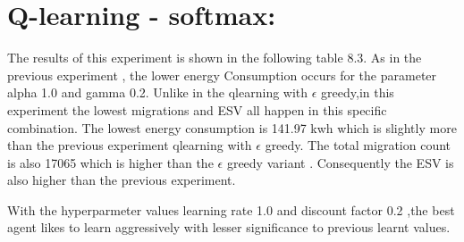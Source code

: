 \documentclass[a4paper,12pt]{Classes/RoboticsLaTeX}
\begin{document}
     
        \section{Q-learning - softmax:}

        The results of this experiment is shown in the following table 8.3. As in the previous experiment , the lower energy Consumption occurs for the parameter alpha 1.0 and gamma 0.2. Unlike in the qlearning with $\epsilon$ greedy,in this experiment the lowest migrations and ESV all happen in this specific combination. The lowest energy consumption is 141.97 kwh which is slightly more than the previous experiment qlearning with $\epsilon$ greedy. The total migration count is also 17065 which is higher than the  $\epsilon$ greedy variant . Consequently the ESV is also higher than the previous experiment.

        With the hyperparmeter values learning rate 1.0 and discount factor 0.2 ,the best agent likes to  learn aggressively with lesser significance to previous learnt values.
\end{document}
